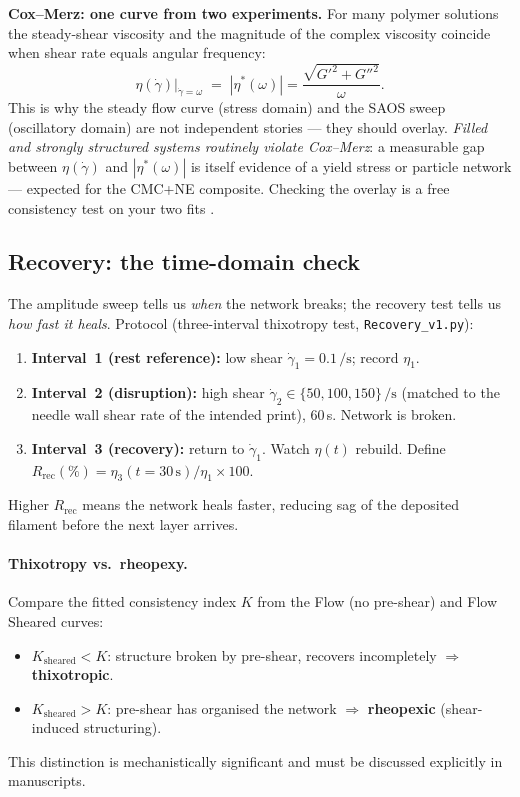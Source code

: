 \documentclass[11pt,a4paper]{article}
\newcommand{\gd}{\dot{\gamma}}
\begin{document}
\begin{goingdeeperbox}
\textbf{Cox--Merz: one curve from two experiments.} For many polymer
solutions the steady-shear viscosity and the magnitude of the complex
viscosity coincide when shear rate equals angular frequency:
\begin{equation}
\eta(\gd)\big|_{\gd=\omega} \;=\; |\eta^*(\omega)|
   =\frac{\sqrt{G'^2+G''^2}}{\omega}.
\label{eq:coxmerz}
\end{equation}
This is why the steady flow curve (stress domain) and the SAOS sweep
(oscillatory domain) are not independent stories --- they should overlay.
\emph{Filled and strongly structured systems routinely violate Cox--Merz}:
a measurable gap between $\eta(\gd)$ and $|\eta^*(\omega)|$ is itself
evidence of a yield stress or particle network --- expected for the
CMC+NE composite. Checking the overlay is a free consistency test on your
two fits \citep{CoxMerz1958}.
\end{goingdeeperbox}

\subsection{Recovery: the time-domain check}

The amplitude sweep tells us \emph{when} the network breaks; the recovery
test tells us \emph{how fast it heals}. Protocol (three-interval
thixotropy test, \texttt{Recovery\_v1.py}):

\begin{enumerate}[leftmargin=1.6em,itemsep=2pt]
\item \textbf{Interval~1 (rest reference):} low shear $\gd_1=0.1\,\si{\per\s}$;
  record $\eta_1$.
\item \textbf{Interval~2 (disruption):} high shear $\gd_2\in\{50, 100,
  150\}\,\si{\per\s}$ (matched to the needle wall shear rate of the
  intended print), 60\,\si{\s}. Network is broken.
\item \textbf{Interval~3 (recovery):} return to $\gd_1$. Watch $\eta(t)$
  rebuild. Define $R_\mathrm{rec}(\%) = \eta_3(t=30\,\si{\s})/\eta_1\times 100$.
\end{enumerate}

Higher $R_\mathrm{rec}$ means the network heals faster, reducing sag of
the deposited filament before the next layer arrives.

\paragraph{Thixotropy vs.\ rheopexy.}
Compare the fitted consistency index $K$ from the Flow (no pre-shear)
and Flow Sheared curves:
\begin{itemize}[leftmargin=1.4em,itemsep=1pt]
\item $K_\mathrm{sheared} < K$: structure broken by pre-shear, recovers
  incompletely $\Rightarrow$ \textbf{thixotropic}.
\item $K_\mathrm{sheared} > K$: pre-shear has organised the network
  $\Rightarrow$ \textbf{rheopexic} (shear-induced structuring).
\end{itemize}
This distinction is mechanistically significant and must be discussed
explicitly in manuscripts.
\end{document}
